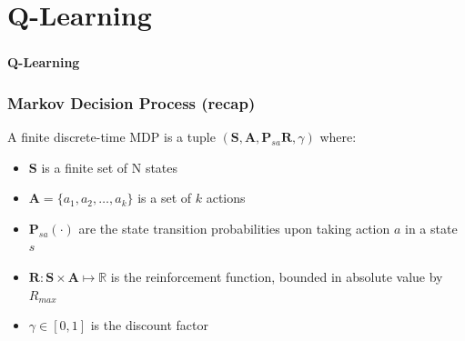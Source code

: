 \section{Q-Learning}

\begin{frame}
	\frametitle{}
	
	\Huge
	
	\vspace{0.5cm}
	
	\begin{center}
		\textbf{Q-Learning}
	\end{center}
\end{frame}

\begin{frame}
	\frametitle{Markov Decision Process (recap)}
	
	\large
	
	A finite discrete-time MDP is a tuple $ (\mathbf{S},\mathbf{A},\mathbf{P}_{sa}
	\mathbf{R},\gamma) $ where:
	
	\begin{itemize}
		\item $ \mathbf{S} $ is a finite set of N states
		\vspace{0.1cm}
		\item  $ \mathbf{A} = \{ a_1, a_2, \ldots, a_k \} $ is a set of $ k $ actions
		\vspace{0.1cm}
		\item $ \mathbf{P}_{sa}(\cdot) $ are the state transition probabilities upon taking
			  action $ a $ in a state $ s $
		\vspace{0.1cm}
		\item $ \mathbf{R} : \mathbf{S} \times \mathbf{A}  \mapsto \mathds{R} $ is the
			  reinforcement function, bounded in absolute value by $ R_{max} $
		\vspace{0.1cm}
		\item $ \gamma \in [0,1] $ is the discount factor
	\end{itemize}
\end{frame}

